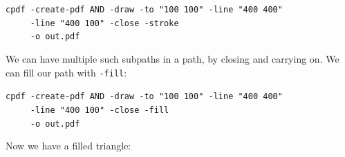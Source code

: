 \documentclass{book}
\begin{document}
\begin{framed}
 \noindent\small\verb?cpdf -create-pdf AND -draw -to "100 100" -line "400 400"?\\
 \noindent\small\verb?     -line "400 100" -close -stroke?\\
 \noindent\small\verb?     -o out.pdf?
\end{framed}

\noindent We can have multiple such subpaths in a path, by closing and carrying on. We can fill our path with \texttt{-fill}:

\begin{framed}
 \noindent\small\verb?cpdf -create-pdf AND -draw -to "100 100" -line "400 400"?\\
 \noindent\small\verb?     -line "400 100" -close -fill?\\
 \noindent\small\verb?     -o out.pdf?
\end{framed}

\noindent Now we have a filled triangle:
\end{document}
